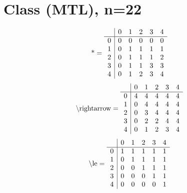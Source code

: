 \documentclass[11pt]{article}
\begin{document}
\section{Class (MTL), n=22}
\[\text{*} = 
\begin{array}{r | r r r r r}
 & 0 & 1 & 2 & 3 & 4 \\ \hline
0 & 0 & 0 & 0 & 0 & 0 \\
1 & 0 & 1 & 1 & 1 & 1 \\
2 & 0 & 1 & 1 & 1 & 2 \\
3 & 0 & 1 & 1 & 3 & 3 \\
4 & 0 & 1 & 2 & 3 & 4 \\
\end{array}
\]
\[\text{\textbackslash rightarrow} = 
\begin{array}{r | r r r r r}
 & 0 & 1 & 2 & 3 & 4 \\ \hline
0 & 4 & 4 & 4 & 4 & 4 \\
1 & 0 & 4 & 4 & 4 & 4 \\
2 & 0 & 3 & 4 & 4 & 4 \\
3 & 0 & 2 & 2 & 4 & 4 \\
4 & 0 & 1 & 2 & 3 & 4 \\
\end{array}
\]
\[\text{\textbackslash le} = 
\begin{array}{r | r r r r r}
 & 0 & 1 & 2 & 3 & 4 \\ \hline
0 & 1 & 1 & 1 & 1 & 1 \\
1 & 0 & 1 & 1 & 1 & 1 \\
2 & 0 & 0 & 1 & 1 & 1 \\
3 & 0 & 0 & 0 & 1 & 1 \\
4 & 0 & 0 & 0 & 0 & 1 \\
\end{array}
\]
\end{document}
